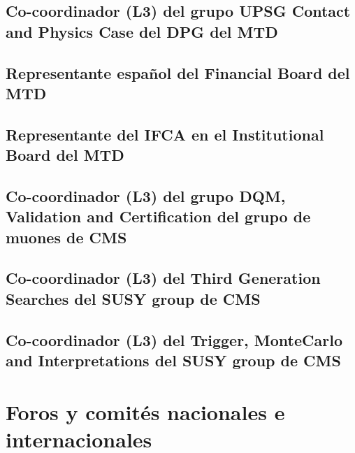 \documentclass[a4paper, 11pt, twoside, openright]{report}
\begin{document}
\subsection{Co-coordinador (L3) del grupo UPSG Contact and Physics Case del DPG del MTD}


\subsection{Representante español del Financial Board del MTD}


\subsection{Representante del IFCA en el Institutional Board del MTD}


\subsection{Co-coordinador (L3) del grupo DQM, Validation and Certification del grupo de muones de CMS}


\subsection{Co-coordinador (L3) del Third Generation Searches del SUSY group de CMS}


\subsection{Co-coordinador (L3) del Trigger, MonteCarlo and Interpretations del SUSY group de CMS}



\section{Foros y comités nacionales e internacionales}
\end{document}

